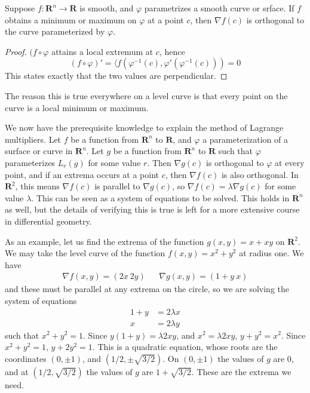\begin{lemma}
    Suppose $f:\mathbf{R}^n \to \mathbf{R}$ is smooth, and $\varphi$ parametrizes a smooth curve or srface. If $f$ obtains a minimum or maximum on $\varphi$ at a point $c$, then $\nabla f(c)$ is orthogonal to the curve parameterized by $\varphi$.
\end{lemma}
\begin{proof}
    $(f \circ \varphi$ attains a local extremum at $c$, hence
    \[ (f \circ \varphi)' = \langle f(\varphi^{-1}(c), \varphi'(\varphi^{-1}(c))) = 0 \]
    This states exactly that the two values are perpendicular.
\end{proof}

The reason this is true everywhere on a level curve is that every point on the curve is a local minimum or maximum.

We now have the prerequisite knowledge to explain the method of Lagrange multipliers. Let $f$ be a function from $\mathbf{R}^n$ to $\mathbf{R}$, and $\varphi$ a parameterization of a surface or curve in $\mathbf{R}^n$. Let $g$ be a function from $\mathbf{R}^n$ to $\mathbf{R}$ such that $\varphi$ parameterizes $L_r(g)$ for some value $r$. Then $\nabla g(c)$ is orthogonal to $\varphi$ at every point, and if an extrema occurs at a point $c$, then $\nabla f(c)$ is also orthogonal. In $\mathbf{R}^2$, this means $\nabla f(c)$ is parallel to $\nabla g(c)$, so $\nabla f(c) = \lambda \nabla g(c)$ for some value $\lambda$. This can be seen as a system of equations to be solved. This holds in $\mathbf{R}^n$ as well, but the details of verifying this is true is left for a more extensive course in differential geometry.

As an example, let us find the extrema of the function $g(x,y) = x + xy$ on $\mathbf{R}^2$. We may take the level curve of the function $f(x,y) = x^2 + y^2$ at radius one. We have
%
\begin{align*}
    \nabla f(x,y) = (2x\ 2y) && \nabla g(x,y) = (1 + y\ x)
\end{align*}
%
and these must be parallel at any extrema on the circle, so we are solving the system of equations
%
\begin{align*}
    1 + y &= 2 \lambda x\\
    x &= 2 \lambda y
\end{align*}
%
such that $x^2 + y^2 = 1$. Since $y(1 + y) = \lambda 2xy$, and $x^2 = \lambda 2xy$, $y + y^2 = x^2$. Since $x^2 + y^2 = 1$, $y + 2y^2 = 1$. This is a quadratic equation, whose roots are the coordinates $(0, \pm 1)$, and $(1/2, \pm \sqrt{3/2})$. On $(0,\pm 1)$ the values of $g$ are 0, and at $(1/2, \sqrt{3/2})$ the values of $g$ are $1 + \sqrt{3/2}$. These are the extrema we need.






